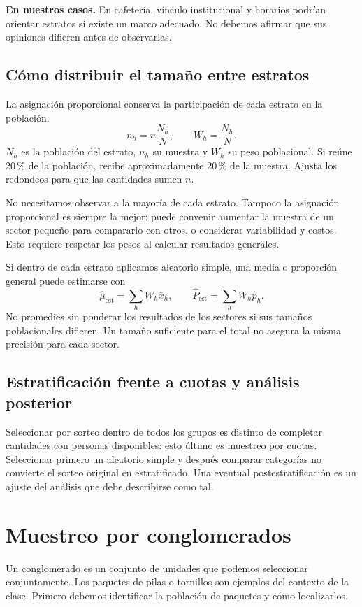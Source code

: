 \documentclass[11pt,letterpaper]{article}
\begin{document}
\textbf{En nuestros casos.} En cafetería, vínculo institucional y horarios podrían orientar estratos si existe un marco adecuado. No debemos afirmar que sus opiniones difieren antes de observarlas.

\subsection{Cómo distribuir el tamaño entre estratos}
La asignación proporcional conserva la participación de cada estrato en la población:
\[
n_h=n\frac{N_h}{N},\qquad W_h=\frac{N_h}{N}.
\]
$N_h$ es la población del estrato, $n_h$ su muestra y $W_h$ su peso poblacional. Si reúne 20\,\% de la población, recibe aproximadamente 20\,\% de la muestra. Ajusta los redondeos para que las cantidades sumen $n$.

No necesitamos observar a la mayoría de cada estrato. Tampoco la asignación proporcional es siempre la mejor: puede convenir aumentar la muestra de un sector pequeño para compararlo con otros, o considerar variabilidad y costos. Esto requiere respetar los pesos al calcular resultados generales.

Si dentro de cada estrato aplicamos aleatorio simple, una media o proporción general puede estimarse con
\[
\widehat\mu_{\mathrm{est}}=\sum_h W_h\bar{x}_h,
\qquad\widehat P_{\mathrm{est}}=\sum_h W_h\widehat p_h.
\]
No promedies sin ponderar los resultados de los sectores si sus tamaños poblacionales difieren. Un tamaño suficiente para el total no asegura la misma precisión para cada sector.
\subsection{Estratificación frente a cuotas y análisis posterior}
Seleccionar por sorteo dentro de todos los grupos es distinto de completar cantidades con personas disponibles: esto último es muestreo por cuotas. Seleccionar primero un aleatorio simple y después comparar categorías no convierte el sorteo original en estratificado. Una eventual postestratificación es un ajuste del análisis que debe describirse como tal.
\clearpage
\section{Muestreo por conglomerados}
Un conglomerado es un conjunto de unidades que podemos seleccionar conjuntamente. Los paquetes de pilas o tornillos son ejemplos del contexto de la clase. Primero debemos identificar la población de paquetes y cómo localizarlos.
\end{document}
